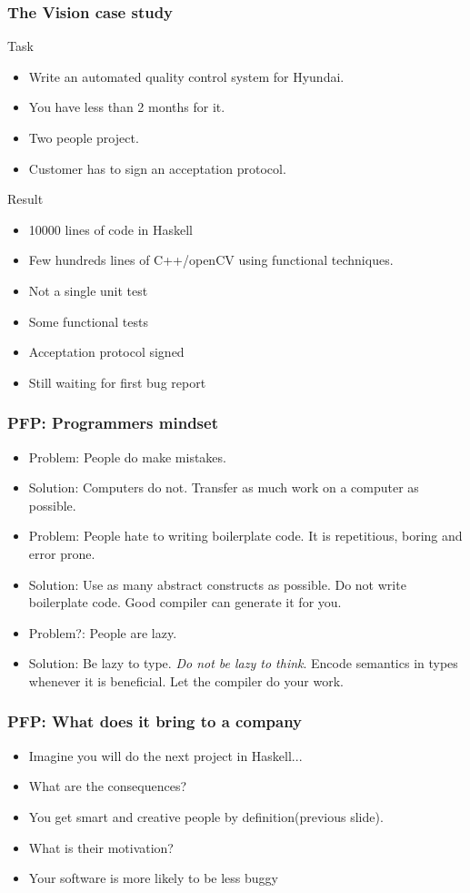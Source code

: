\documentclass[11pt]{beamer}
\begin{document}
\begin{frame}
	\frametitle{The Vision case study}
	\begin{block}{Task}
		\begin{itemize}[<+->]
			\item Write an automated quality control system for Hyundai.
			\item You have less than 2 months for it.
			\item Two people project.
			\item Customer has to sign an acceptation protocol.
		\end{itemize}
	\end{block}
	\begin{block}{Result}
		\begin{itemize}[<+->]
			\item 10000 lines of code in Haskell
			\item Few hundreds lines of C++/openCV using functional techniques.
			\item Not a single unit test
			\item Some functional tests
			\item Acceptation protocol signed
			\item Still waiting for first bug report
		\end{itemize}
	\end{block}
\end{frame}

\begin{frame}
	\frametitle{PFP: Programmers mindset}		
	\begin{itemize}[<+->]
		\item Problem: People do make mistakes. 
		\item Solution: Computers do not. Transfer as much work on a computer as possible.
		\item Problem: People hate to writing boilerplate code. It is repetitious, boring and error prone.
		\item Solution: Use as many abstract constructs as possible. Do not write boilerplate code. Good compiler can generate it for you.
		\item Problem?: People are lazy.
		\item Solution: Be lazy to type. \textit{Do not be lazy to think}. Encode semantics in types whenever it is beneficial. Let the compiler do your work.
	\end{itemize}
\end{frame}

\begin{frame} 
	\frametitle{PFP: What does it bring to a company}		
	\begin{itemize}[<+->]
		\item Imagine you will do the next project in Haskell...
		\item What are the consequences?
		\item You get smart and creative people by definition(previous slide).
		\item What is their motivation?
		\item Your software is more likely to be less buggy
	\end{itemize}
\end{frame}
\end{document}
